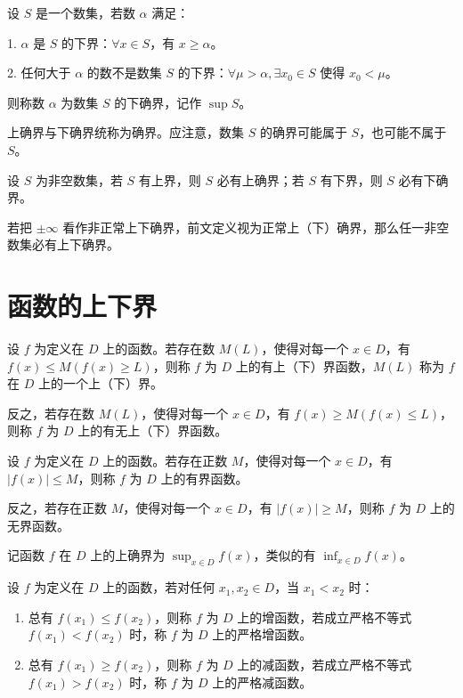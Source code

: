 \begin{definition}[下确界]
	设 $S$ 是一个数集，若数 $\alpha$ 满足：
	
	1. $\alpha$ 是 $S$ 的下界：$\forall x\in S$，有 $x\geqslant \alpha$。
	
	2. 任何大于 $\alpha$ 的数不是数集 $S$ 的下界：$\forall \mu>\alpha, \exists x_0\in S$ 使得 $x_0<\mu$。
	
	则称数 $\alpha$ 为数集 $S$ 的下确界，记作 $\sup S$。
\end{definition}

上确界与下确界统称为确界。应注意，数集 $S$ 的确界可能属于 $S$，也可能不属于 $S$。

\begin{theorem}[确界原理]
	设 $S$ 为非空数集，若 $S$ 有上界，则 $S$ 必有上确界；若 $S$ 有下界，则 $S$ 必有下确界。
\end{theorem}

若把 $\pm \infty$ 看作非正常上下确界，前文定义视为正常上（下）确界，那么任一非空数集必有上下确界。

\section{函数的上下界}

\begin{definition}
	设 $f$ 为定义在 $D$ 上的函数。若存在数 $M(L)$，使得对每一个 $x\in D$，有 $f(x)\leqslant M(f(x) \ge L)$，则称 $f$ 为 $D$ 上的有上（下）界函数，$M(L)$ 称为 $f$ 在 $D$ 上的一个上（下）界。

	反之，若存在数 $M(L)$，使得对每一个 $x\in D$，有 $f(x)\ge M(f(x) \leqslant L)$，则称 $f$ 为 $D$ 上的有无上（下）界函数。
\end{definition}

\begin{definition}
	设 $f$ 为定义在 $D$ 上的函数。若存在正数 $M$，使得对每一个 $x\in D$，有 $|f(x)|\leqslant M$，则称 $f$ 为 $D$ 上的有界函数。

	反之，若存在正数 $M$，使得对每一个 $x\in D$，有 $|f(x)|\ge M$，则称 $f$ 为 $D$ 上的无界函数。
\end{definition}

记函数 $f$ 在 $D$ 上的上确界为 $\sup_{x\in D} f(x)$，类似的有 $\inf_{x\in D} f(x)$。

\begin{definition}
	设 $f$ 为定义在 $D$ 上的函数，若对任何 $x_1,x_2\in D$，当 $x_1<x_2$ 时：
	\begin{enumerate}
		\item 总有 $f(x_1) \leqslant f(x_2)$，则称 $f$ 为 $D$ 上的增函数，若成立严格不等式 $f(x_1) < f(x_2)$ 时，称 $f$ 为 $D$ 上的严格增函数。
		\item 总有 $f(x_1) \ge f(x_2)$，则称 $f$ 为 $D$ 上的减函数，若成立严格不等式 $f(x_1) > f(x_2)$ 时，称 $f$ 为 $D$ 上的严格减函数。
	\end{enumerate}
\end{definition}

